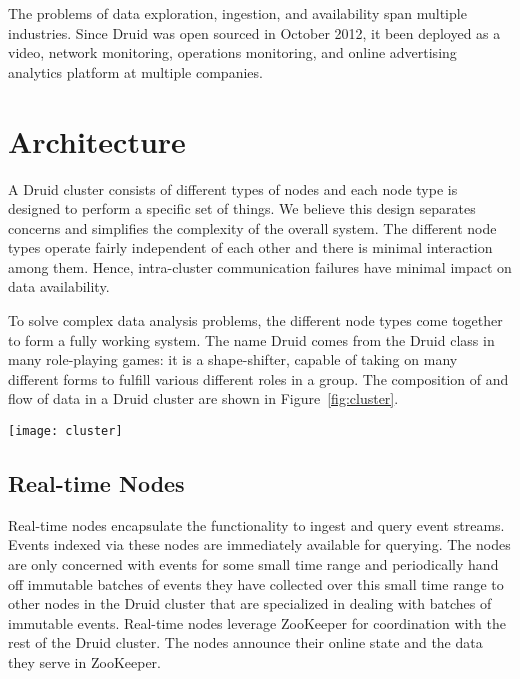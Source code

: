 \documentclass{sig-alternate-2013}
\begin{document}
The problems of data exploration, ingestion, and availability span multiple
industries. Since Druid was open sourced in October 2012, it been deployed as a
video, network monitoring, operations monitoring, and online advertising
analytics platform at multiple companies.

\section{Architecture}
\label{sec:architecture}
A Druid cluster consists of different types of nodes and each node type is
designed to perform a specific set of things. We believe this design separates
concerns and simplifies the complexity of the overall system. The different
node types operate fairly independent of each other and there is minimal
interaction among them. Hence, intra-cluster communication failures have
minimal impact on data availability.

To solve complex data analysis problems, the different node types come together
to form a fully working system. The name Druid comes from the Druid class in
many role-playing games: it is a shape-shifter, capable of taking on many
different forms to fulfill various different roles in a group. The composition
of and flow of data in a Druid cluster are shown in Figure~\ref{fig:cluster}.

\begin{figure*}
\centering
\texttt{[image: cluster]}
\caption{An overview of a Druid cluster and the flow of data through the cluster.}
\label{fig:cluster}
\end{figure*}

\subsection{Real-time Nodes}
\label{sec:realtime}
Real-time nodes encapsulate the functionality to ingest and query event
streams. Events indexed via these nodes are immediately available for querying.
The nodes are only concerned with events for some small time range and
periodically hand off immutable batches of events they have collected over this
small time range to other nodes in the Druid cluster that are specialized in
dealing with batches of immutable events. Real-time nodes leverage ZooKeeper
\cite{hunt2010zookeeper} for coordination with the rest of the Druid cluster.
The nodes announce their online state and the data they serve in
ZooKeeper.
\end{document}
